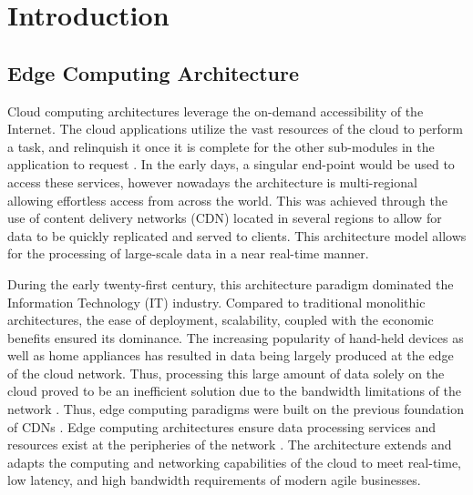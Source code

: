 \clearpage

\def\chaptertitle{Introduction}

\lhead{\emph{\chaptertitle}}

\chapter{\chaptertitle}
\label{ch:introduction}

\section{Edge Computing Architecture}
\label{sec:edge-arch}

Cloud computing architectures leverage the on-demand accessibility of the Internet. The cloud applications utilize the vast resources of the cloud to perform a task, and relinquish it once it is complete for the other sub-modules in the application to request \cite{rimal2009taxonomy}. In the early days, a singular end-point would be used to access these services, however nowadays the architecture is multi-regional allowing effortless access from across the world. This was achieved through the use of content delivery networks (CDN) located in several regions to allow for data to be quickly replicated and served to clients. This architecture model allows for the processing of large-scale data in a near real-time manner.\par

During the early twenty-first century, this architecture paradigm dominated the Information Technology (IT) industry. Compared to traditional monolithic architectures, the ease of deployment, scalability, coupled with the economic benefits ensured its dominance. The increasing popularity of hand-held devices as well as home appliances has resulted in data being largely produced at the edge of the cloud network. Thus, processing this large amount of data solely on the cloud proved to be an inefficient solution due to the bandwidth limitations of the network \cite{shi2016edge}. Thus, edge computing paradigms were built on the previous foundation of CDNs \cite{satyanarayanan2017emergence}. Edge computing architectures ensure data processing services and resources exist at the peripheries of the network \cite{cao2020overview}. The architecture extends and adapts the computing and networking capabilities of the cloud to meet real-time, low latency, and high bandwidth requirements of modern agile businesses.\par

